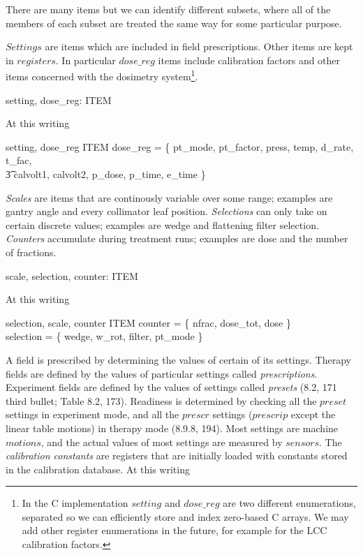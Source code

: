 There are many items but we can identify different subsets, where all
of the members of each subset are treated the same way for some
particular purpose.
  
$Settings$ are items which are included in field prescriptions.  Other
items are kept in $registers$.  In particular $dose\_reg$ items
include calibration factors and other items concerned with the
dosimetry system\footnote{In the C implementation $setting$ and
$dose\_reg$ are two different enumerations, separated so we can
efficiently store and index zero-based C arrays.  We may add other
register enumerations in the future, for example for the LCC
calibration factors.}.

\begin{axdef}
	setting, dose\_reg: \power ITEM \\
\end{axdef}
At this writing

\begin{zed}
	\langle setting, dose\_reg \rangle \partition ITEM
\also
	dose\_reg = \{ pt\_mode, pt\_factor, press, temp, d\_rate, t\_fac, \\
\t3		calvolt1, calvolt2, p\_dose, p\_time, e\_time \}
\end{zed}
{\em Scales} are items that are continously variable over some range;
examples are gantry angle and every collimator leaf position.  
{\em Selections} can only take on certain discrete values; examples are
wedge and flattening filter selection.  {\em Counters} accumulate
during treatment runs; examples are dose and the number of fractions.

\begin{axdef}
	scale, selection, counter: \power ITEM
\end{axdef}
At this writing

\begin{zed}
	\langle selection, scale, counter \rangle \partition ITEM
\also
	counter = \{ nfrac, dose\_tot, dose \} \\
	selection = \{ wedge, w\_rot, filter, pt\_mode \} \\
\end{zed}
A field is prescribed by determining the values of certain of its
settings.  Therapy fields are defined by the values of particular
settings called {\em prescriptions}.  Experiment fields are defined by
the values of settings called {\em presets} (8.2, 171 third bullet;
Table 8.2, 173).  Readiness is determined by checking all the $preset$
settings in experiment mode, and all the $prescr$ settings ($prescrip$
except the linear table motions) in therapy mode (8.9.8, 194).
Most settings are machine $motions$, and the actual values of most
settings are measured by $sensors$.  The {\em calibration constants}
are registers that are initially loaded with constants stored in the
calibration database.  At this writing



